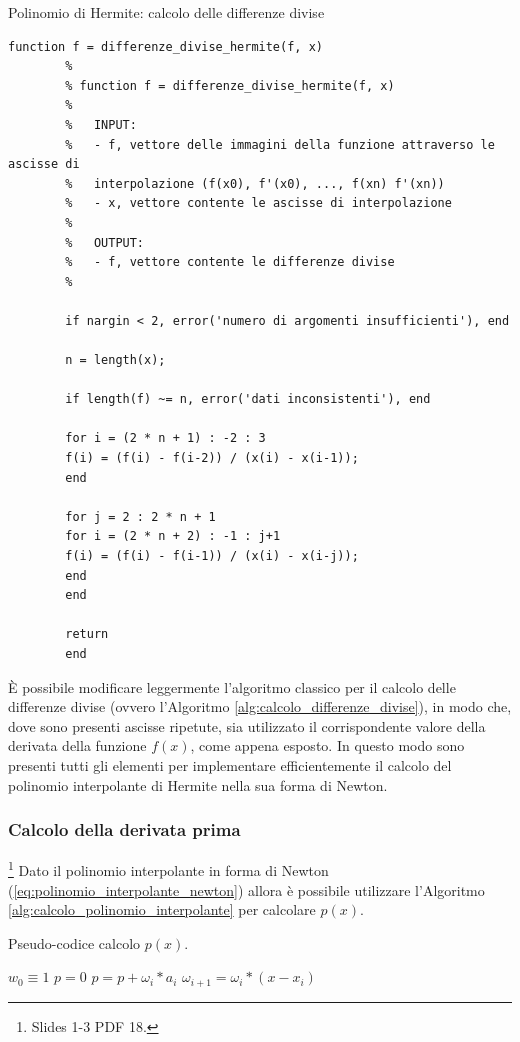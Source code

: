 \begin{algorithm}
	\caption{Polinomio di Hermite: calcolo delle differenze divise}\label{alg:differenze_divise_polinomio_hermite}
	\begin{lstlisting}[style=Matlab-editor]
		function f = differenze_divise_hermite(f, x)
		%
		% function f = differenze_divise_hermite(f, x)
		%
		%	INPUT:
		%	- f, vettore delle immagini della funzione attraverso le ascisse di
		%	interpolazione (f(x0), f'(x0), ..., f(xn) f'(xn))
		%	- x, vettore contente le ascisse di interpolazione
		%
		%	OUTPUT:
		%	- f, vettore contente le differenze divise
		%
		
		if nargin < 2, error('numero di argomenti insufficienti'), end
		
		n = length(x);
		
		if length(f) ~= n, error('dati inconsistenti'), end
		
		for i = (2 * n + 1) : -2 : 3
		f(i) = (f(i) - f(i-2)) / (x(i) - x(i-1));
		end
		
		for j = 2 : 2 * n + 1
		for i = (2 * n + 2) : -1 : j+1
		f(i) = (f(i) - f(i-1)) / (x(i) - x(i-j));
		end
		end
		
		return
		end
	\end{lstlisting}
\end{algorithm} 

È possibile modificare leggermente l'algoritmo classico per il calcolo delle differenze divise (ovvero l'Algoritmo \ref{alg:calcolo_differenze_divise}), in modo che, dove sono presenti ascisse ripetute, sia utilizzato il corrispondente valore della derivata della funzione $f(x)$, come appena esposto. In questo modo sono presenti tutti gli elementi per implementare efficientemente il calcolo del polinomio interpolante di Hermite nella sua forma di Newton.

\subsubsection{Calcolo della derivata prima}\label{sssec:calcolo_derivata_prima}
\footnote{Slides 1-3 PDF 18.} Dato il polinomio interpolante in forma di Newton (\ref{eq:polinomio_interpolante_newton}) allora è possibile utilizzare l'Algoritmo \ref{alg:calcolo_polinomio_interpolante} per calcolare $p(x)$.

\begin{algorithm}\caption{Pseudo-codice calcolo $p(x)$.}\label{alg:calcolo_polinomio_interpolante}
	\begin{algorithmic}
		\State $w_0\equiv 1$
		\State $p = 0$
		\State $p = p + \omega_i * a_i$
		\State $\omega_{i+1} = \omega_i *(x - x_i)$
		\EndFor
	\end{algorithmic}
\end{algorithm}

